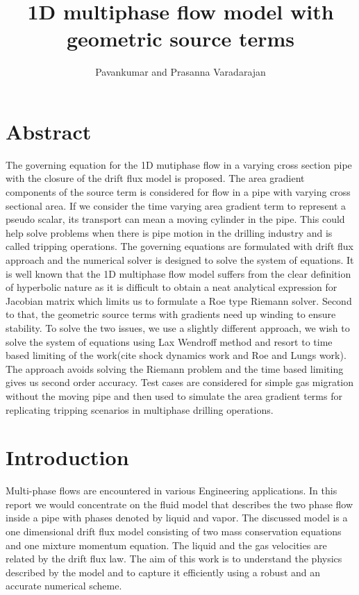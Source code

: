 \documentclass[a4paper,16pt]{article}
\title{\large \bf 1D multiphase flow model with geometric source terms}
\author{Pavankumar and Prasanna Varadarajan }
\date{}
\begin{document}
\maketitle
\section{Abstract}
The governing equation for the 1D mutiphase flow in a varying cross section pipe with the closure of the drift flux model is proposed. The area gradient components of the source term is considered for flow in a pipe with varying cross sectional area. If we consider the time varying area gradient term to represent a pseudo scalar, its transport can mean a moving cylinder in the pipe. This could help solve problems when there is pipe motion in the drilling industry and is called tripping operations. The governing equations are formulated with drift flux approach and the numerical solver is designed to solve the system of equations. It is well known that the 1D multiphase flow model suffers from the clear definition of hyperbolic nature as it is difficult to obtain a neat analytical expression for Jacobian matrix which limits us to formulate a Roe type Riemann solver. Second to that, the geometric source terms with gradients need up winding to ensure stability.  To solve the two issues, we use a slightly different approach, we wish to solve the system of equations using Lax Wendroff method and resort to time based limiting of the work(cite shock dynamics work and Roe and Lungs work). The approach avoids solving the Riemann problem and the time based limiting gives us second order accuracy. Test cases are considered for simple gas migration without the moving pipe and then used to simulate the area gradient terms for replicating tripping scenarios in multiphase drilling operations.
\section{Introduction}
Multi-phase flows are encountered in various Engineering applications. In this report we would concentrate on the fluid model that describes the two phase flow inside a pipe with phases denoted by liquid and vapor. The discussed model is a one dimensional drift flux model consisting of two mass conservation equations and one mixture momentum equation. The liquid and the gas velocities are related by the drift flux law. The aim of this work is to understand  the physics described by the model and to capture it efficiently using a robust and an accurate numerical scheme.
\end{document}
